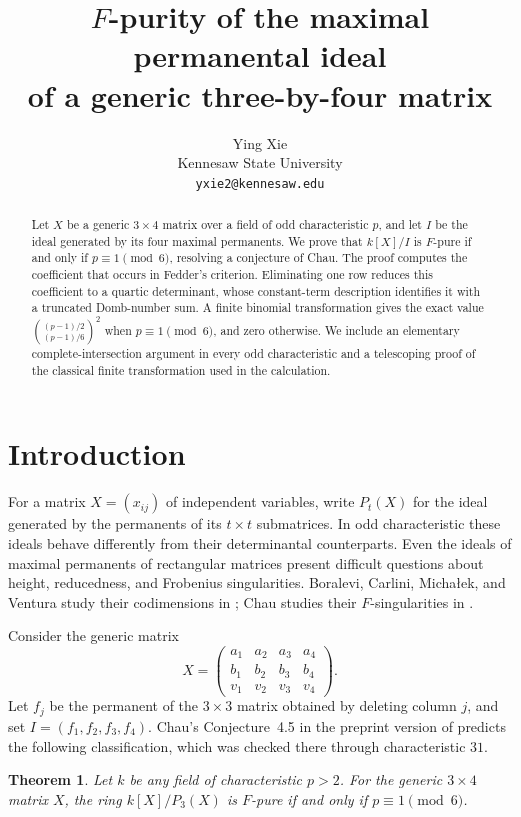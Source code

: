 \documentclass[11pt]{article}
\title{$F$-purity of the maximal permanental ideal\\of a generic three-by-four matrix}
\author{Ying Xie\\Kennesaw State University\\\texttt{yxie2@kennesaw.edu}}
\date{}
\newtheorem{theorem}{Theorem}[section]
\theoremstyle{remark}\newtheorem{remark}[theorem]{Remark}
\numberwithin{equation}{section}
\begin{document}
\maketitle
\begin{abstract}
Let $X$ be a generic $3\times4$ matrix over a field of odd
characteristic $p$, and let $I$ be the ideal generated by its four
maximal permanents. We prove that $k[X]/I$ is $F$-pure if and only if
$p\equiv1\pmod6$, resolving a conjecture of Chau. The proof computes
the coefficient that occurs in Fedder's criterion. Eliminating one row
reduces this coefficient to a quartic determinant, whose constant-term
description identifies it with a truncated Domb-number sum. A finite
binomial transformation gives the exact value
$\binom{(p-1)/2}{(p-1)/6}^{2}$ when $p\equiv1\pmod6$, and zero
otherwise. We include an elementary complete-intersection argument
in every odd characteristic and a telescoping proof of the classical
finite transformation used in the calculation.
\end{abstract}

\section{Introduction}
For a matrix $X=(x_{ij})$ of independent variables, write $P_t(X)$ for
the ideal generated by the permanents of its $t\times t$ submatrices.
In odd characteristic these ideals behave differently from their
determinantal counterparts. Even the ideals of maximal permanents of
rectangular matrices present difficult questions about height,
reducedness, and Frobenius singularities. Boralevi, Carlini, Micha\l{}ek,
and Ventura study their codimensions in \cite{BCMV}; Chau studies
their $F$-singularities in \cite{Chau}.

Consider the generic matrix
\[
 X=\begin{pmatrix}
 a_1&a_2&a_3&a_4\\ b_1&b_2&b_3&b_4\\v_1&v_2&v_3&v_4
 \end{pmatrix}.
\]
Let $f_j$ be the permanent of the $3\times3$ matrix obtained by
deleting column $j$, and set $I=(f_1,f_2,f_3,f_4)$. Chau's
Conjecture~4.5 in the preprint version of \cite{Chau} predicts the
following classification, which was checked there through
characteristic $31$.

\begin{theorem}\label{thm:main}
Let $k$ be any field of characteristic $p>2$. For the generic
$3\times4$ matrix $X$, the ring $k[X]/P_3(X)$ is $F$-pure if and only
if $p\equiv1\pmod6$.
\end{theorem}
\end{document}
